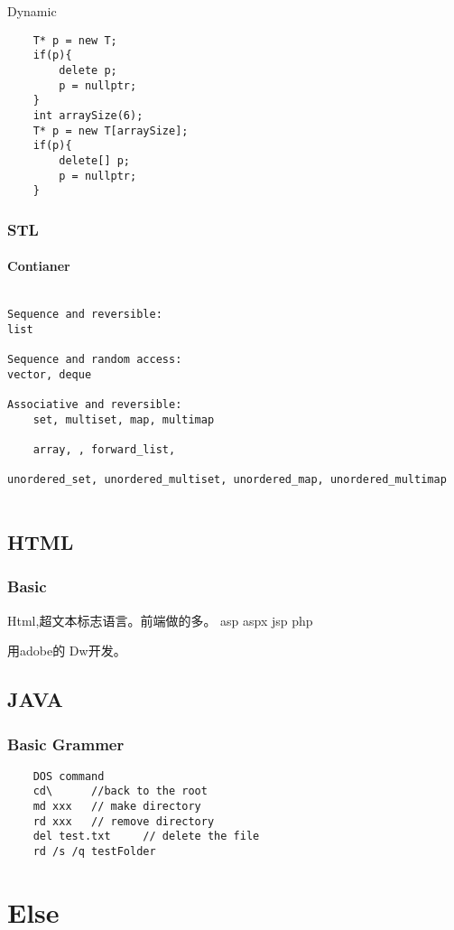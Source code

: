 \documentclass[UTF8]{../computerUniverse}
\begin{document}
Dynamic
\begin{lstlisting}
    T* p = new T;
    if(p){
        delete p;
        p = nullptr;
    }
    int arraySize(6);
    T* p = new T[arraySize];
    if(p){
        delete[] p;
        p = nullptr;
    }
\end{lstlisting}



\subsection{STL}
\subsubsection{Contianer}
\begin{lstlisting}

Sequence and reversible:
list 

Sequence and random access:
vector, deque

Associative and reversible:
    set, multiset, map, multimap  

    array, , forward_list,  

unordered_set, unordered_multiset, unordered_map, unordered_multimap  


\end{lstlisting}




\section{HTML}

\subsection{Basic}
Html,超文本标志语言。前端做的多。
asp
aspx
jsp
php

用adobe的 Dw开发。


\section{JAVA}

\subsection{Basic Grammer}
\begin{lstlisting}
    DOS command
    cd\      //back to the root
    md xxx   // make directory
    rd xxx   // remove directory
    del test.txt     // delete the file
    rd /s /q testFolder
 \end{lstlisting}


\chapter{Else}
\end{document}
